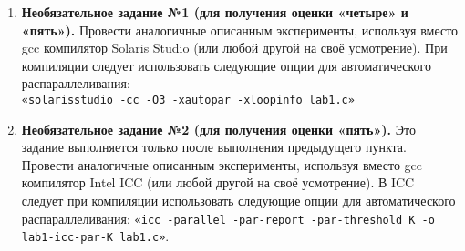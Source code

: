 {\begin{enumerate}
\begin{itemize}
				 lab1-par-K для значений \\$N\;=\;{N1,\;N1+\Delta,\;N1+2\Delta,\;N1+3\Delta,…,\;N2}$ и записывать получающиеся значения времени delta\textunderscore ms(N) в функцию $par-K(N)$;
				 $\Delta$ выбрать так: $\Delta\;=\;(N2\;-\;N1)/10$.
			\end{itemize}
		 отчёт о проделанной работе.
		 к устным вопросам на защите.
		 вычислительную сложность алгоритма до и после распараллеливания, сравнить полученные результаты.
		\sloppy
		\item\textbf{Необязательное задание №1 (для получения оценки «четыре» и «пять»).} Провести аналогичные описанным эксперименты, используя вместо gcc компилятор Solaris Studio (или любой другой на своё усмотрение). При компиляции следует использовать следующие опции для автоматического распараллеливания: \\\verb+«solarisstudio -cc -O3 -xautopar -xloopinfo lab1.c»+
 		\item\textbf{Необязательное задание №2 (для получения оценки «пять»).} Это задание выполняется только после выполнения предыдущего пункта. Провести аналогичные описанным эксперименты, используя вместо gcc компилятор Intel ICC (или любой другой на своё усмотрение). В ICC следует при компиляции использовать следующие опции для автоматического распараллеливания: \verb+«icc -parallel -par-report -par-threshold K -o lab1-icc-par-K lab1.c»+.
	\end{enumerate}
	
}